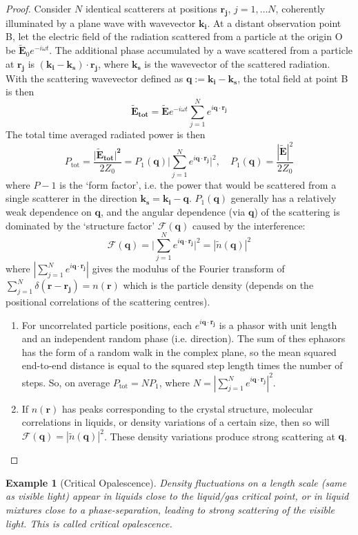 \documentclass[a4paper]{article}
\newtheorem{eg}{Example}[section]
\theoremstyle{new}
\begin{document}
\begin{proof}
Consider $N$ identical scatterers at positions $\mathbf{r_j}$, $j=1,\dots N$, coherently illuminated by a plane wave with wavevector $\mathbf{k_i}$. At a distant observation point B, let the electric field of the radiation scattered from a particle at the origin O be $\mathbf{\tilde{E}}_0e^{-i\omega t}$. The additional phase accumulated by a wave scattered from a particle at $\mathbf{r_j}$ is $(\mathbf{k_i}-\mathbf{k_s})\cdot\mathbf{r_j}$, where $\mathbf{k_s}$ is the wavevector of the scattered radiation. With the scattering wavevector defined as $\mathbf{q}:=\mathbf{k_i}-\mathbf{k_s}$, the total field at point B is then
$$\mathbf{\tilde{E}_{\text{tot}}}=\mathbf{\tilde{E}}e^{-i\omega t}\sum_{j=1}^Ne^{i\mathbf{q}\cdot\mathbf{r_j}}$$
The total time averaged radiated power is then
$$P_{\text{tot}}=\frac{|\mathbf{\tilde{E}_{\text{tot}}|^2}}{2Z_0}=P_1(\mathbf{q})\bigg|\sum_{j=1}^Ne^{i\mathbf{q}\cdot\mathbf{r_j}}\bigg|^2,\quad P_1(\mathbf{q})=\frac{|\mathbf{\tilde{E}}|^2}{2Z_0}$$
where $P-1$ is the `form factor', i.e. the power that would be scattered from a single scatterer in the direction $\mathbf{k_s}=\mathbf{k_i}-\mathbf{q}$. $P_1(\mathbf{q})$ generally has a relatively weak dependence on $\mathbf{q}$, and the angular dependence (via $\mathbf{q}$) of the scattering is dominated by the `structure factor' $\mathcal{F}(\mathbf{q})$ caused by the interference:
$$\mathcal{F}(\mathbf{q})=\bigg|\sum_{j=1}^Ne^{i\mathbf{q}\cdot\mathbf{r_j}}\bigg|^2=|\tilde{n}(\mathbf{q})|^2$$
where $|\sum_{j=1}^Ne^{i\mathbf{q}\cdot\mathbf{r_j}}|$ gives the modulus of the Fourier transform of $\sum_{j=1}^N\delta(\mathbf{r}-\mathbf{r_j})=n(\mathbf{r})$ which is the particle density (depends on the positional correlations of the scattering centres).
\begin{enumerate}
    \item For uncorrelated particle positions, each $e^{i\mathbf{q}\cdot\mathbf{r_j}}$ is a phasor with unit length and an independent random phase (i.e. direction). The sum of thes ephasors has the form of a random walk in the complex plane, so the mean squared end-to-end distance is equal to the squared step length times the number of steps. So, on average $P_{\text{tot}}=NP_1$, where $N=|\sum_{j=1}^Ne^{i\mathbf{q}\cdot\mathbf{r_j}}|^2$.
    \item If $n(\mathbf{r})$ has peaks corresponding to the crystal structure, molecular correlations in liquids, or density variations of a certain size, then so will $\mathcal{F}(\mathbf{q})=|\tilde{n}(\mathbf{q})|^2$. These density variations produce strong scattering at $\mathbf{q}$.
\end{enumerate}
\end{proof}
\begin{eg}[Critical Opalescence]
Density fluctuations on a length scale (same as visible light) appear in liquids close to the liquid/gas critical point, or in liquid mixtures close to a phase-separation, leading to strong scattering of the visible light. This is called critical opalescence.
\end{eg}
\end{document}
